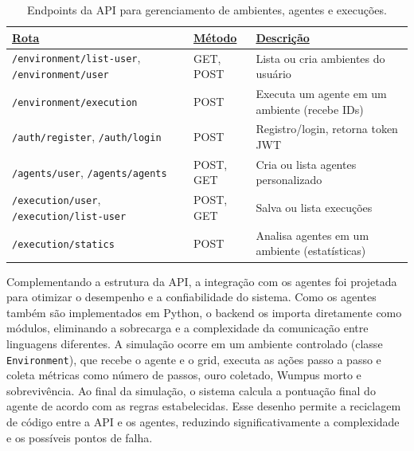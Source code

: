 \begin{table}[ht]
    \centering
    \small
    \begin{tabular}{|p{5.5cm}|p{2cm}|p{6.5cm}|}
        \hline
        \underline{\textbf{Rota}} & \underline{\textbf{Método}} & \underline{\textbf{Descrição}} \\
        \hline
        \texttt{/environment/list-user}, \texttt{/environment/user} & GET, POST & Lista ou cria ambientes do usuário \\
        \hline
        \texttt{/environment/execution} & POST & Executa um agente em um ambiente (recebe IDs) \\
        \hline
        \texttt{/auth/register}, \texttt{/auth/login} & POST & Registro/login, retorna token JWT \\
        \hline
        \texttt{/agents/user}, \texttt{/agents/agents} & POST, GET & Cria ou lista agentes personalizado \\
        \hline
        \texttt{/execution/user}, \texttt{/execution/list-user} & POST, GET & Salva ou lista execuções \\
        \hline
        \texttt{/execution/statics} & POST & Analisa agentes em um ambiente (estatísticas) \\
        \hline
    \end{tabular}
    \caption{Endpoints da API para gerenciamento de ambientes, agentes e execuções.}
    \label{tab:endpoints-api}
\end{table}

Complementando a estrutura da API, a integração com os agentes foi projetada para otimizar o desempenho e a confiabilidade do sistema. Como os agentes também são implementados em Python, o backend os importa diretamente como módulos, eliminando a sobrecarga e a complexidade da comunicação entre linguagens diferentes. A simulação ocorre em um ambiente controlado (classe \texttt{Environment}), que recebe o agente e o grid, executa as ações passo a passo e coleta métricas como número de passos, ouro coletado, Wumpus morto e sobrevivência. Ao final da simulação, o sistema calcula a pontuação final do agente de acordo com as regras estabelecidas. Esse desenho permite a reciclagem de código entre a API e os agentes, reduzindo significativamente a complexidade e os possíveis pontos de falha.

